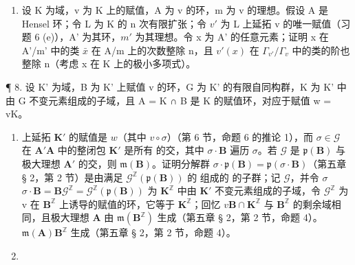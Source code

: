 \begin{enumerate}
\def\labelenumi{\arabic{enumi}.}
\setcounter{enumi}{6}
\tightlist
\item
  设 K 为域，v 为 K 上的赋值，A 为 v 的环，m 为 v 的理想。假设 A 是 Hensel 环；令 L 为 K 的 n 次有限扩张；令 \(v'\) 为 L 上延拓 v 的唯一赋值（习题 6 (e)），A' 为其环，\(m'\) 为其理想。令 x 为 A' 的任意元素；证明 x 在 A'/m' 中的类 \(\bar{x}\) 在 A/m 上的次数整除 n，且 \(v'(x)\) 在 \(\Gamma_{v'}/\Gamma_v\) 中的类的阶也整除 n（考虑 x 在 K 上的极小多项式）。
\end{enumerate}

¶ 8. 设 K' 为域，B 为 K' 上赋值 v 的环，G 为 K' 的有限自同构群，K 为 K' 中由 G 不变元素组成的子域，且 A = K ∩ B 是 K 的赋值环，对应于赋值 w = v\textbar K。

\begin{enumerate}
\def\labelenumi{(\alph{enumi})}
\item
   上延拓 \(\mathbf{K}'\) 的赋值是 \(w\)（其中 \(v \circ \sigma\)）（第 6 节，命题 6 的推论 1），而 \(\sigma \in \mathcal{G}\) 在 \(\mathbf{A}'\)\(\mathbf{A}\) 中的整闭包 \(\mathbf{K}'\) 是所有  的交，其中 \(\sigma \cdot \mathbf{B}\) 遍历 \(\sigma\)。若 \(\mathcal{G}\) 是 \(\mathfrak{p}(\mathbf{B})\) 与极大理想 \(\mathbf{A}'\) 的交，则 \(\mathfrak{m}(\mathbf{B})\)。证明分解群 \(\sigma \cdot \mathfrak{p}(\mathbf{B}) = \mathfrak{p}(\sigma \cdot \mathbf{B})\)（第五章 § 2，第 2 节）是由满足 \(\mathcal{G}^{\mathbb{Z}}(\mathfrak{p}(\mathbf{B}))\) 的  组成的  的子群；记 \(\mathcal{G}\)，并令 \(\sigma\)\(\sigma \cdot \mathbf{B} = \mathbf{B}\)\(\mathcal{G}^{\mathbb{Z}} = \mathcal{G}^{\mathbb{Z}}(\mathfrak{p}(\mathbf{B}))\) 为 \(\mathbf{K}^{\mathbb{Z}}\) 中由 \(\mathbf{K}'\) 不变元素组成的子域，令 \(\mathcal{G}^{\mathbb{Z}}\) 为 v 在 \(\mathbf{B}^{\mathbb{Z}}\) 上诱导的赋值的环，它等于 \(\mathbf{K}^{\mathbb{Z}}\)；回忆 \(v\)\(\mathbf{B} \cap \mathbf{K}^{\mathbb{Z}}\) 与 \(\mathbf{B}^{\mathbb{Z}}\) 的剩余域相同，且极大理想 \(\mathbf{A}\) 由 \(\mathfrak{m}(\mathbf{B}^{\mathbb{Z}})\) 生成（第五章 § 2，第 2 节，命题 4）。\(\mathfrak{m}(\mathbf{A})\mathbf{B}^{\mathbb{Z}}\) 生成（第五章 § 2，第 2 节，命题 4）。
\item

\end{enumerate}
